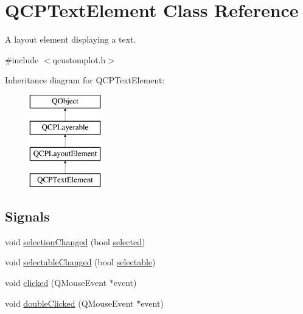 \hypertarget{class_q_c_p_text_element}{}\section{Q\+C\+P\+Text\+Element Class Reference}
\label{class_q_c_p_text_element}


A layout element displaying a text.  




{\ttfamily \#include $<$qcustomplot.\+h$>$}

Inheritance diagram for Q\+C\+P\+Text\+Element\+:\begin{figure}[H]
\begin{center}
\leavevmode
\includegraphics[height=4.000000cm]{d3/d37/class_q_c_p_text_element}
\end{center}
\end{figure}
\subsection*{Signals}
\begin{DoxyCompactItemize}
\item 
void \mbox{\hyperlink{class_q_c_p_text_element_a49f45b87ee9c1fe866c2cdd12af17a9a}{selection\+Changed}} (bool \mbox{\hyperlink{class_q_c_p_text_element_a135d1ad0aa97a245b4247c3292ff551c}{selected}})
\item 
void \mbox{\hyperlink{class_q_c_p_text_element_ac4567260b52d02bfbad63357d13986c5}{selectable\+Changed}} (bool \mbox{\hyperlink{class_q_c_p_text_element_a96e2a712fca40324a8489f75833b4096}{selectable}})
\item 
void \mbox{\hyperlink{class_q_c_p_text_element_ad2246a0e701c0655623f048737298334}{clicked}} (Q\+Mouse\+Event $\ast$event)
\item 
void \mbox{\hyperlink{class_q_c_p_text_element_a9c6fd27ae8a7c3a02df7a6bbd3509e40}{double\+Clicked}} (Q\+Mouse\+Event $\ast$event)
\end{DoxyCompactItemize}
